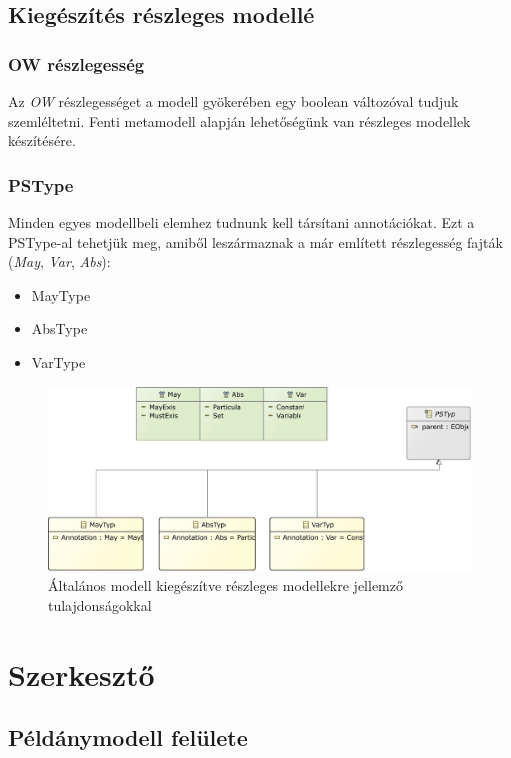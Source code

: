 \subsection{Kiegészítés részleges modellé}

\subsubsection{OW részlegesség}
Az \textit{OW} részlegességet a modell gyökerében egy boolean változóval tudjuk szemléltetni. Fenti metamodell alapján lehetőségünk van részleges modellek készítésére.

\subsubsection{PSType}
Minden egyes modellbeli elemhez tudnunk kell társítani annotációkat. Ezt a PSType-al tehetjük meg, amiből leszármaznak a már említett részlegesség fajták (\textit{May}, \textit{Var}, \textit{Abs}):

\begin{itemize}  
	\item MayType
	\item AbsType
	\item VarType 
\end{itemize}

\begin{figure}[!ht]
	\centering
	\includegraphics[width=150mm]{figures/partialmodel02.pdf}
	\caption{Általános modell kiegészítve részleges modellekre jellemző tulajdonságokkal}
	\label{partialmodel} 
\end{figure}

\section{Szerkesztő}
\subsection{Példánymodell felülete}
